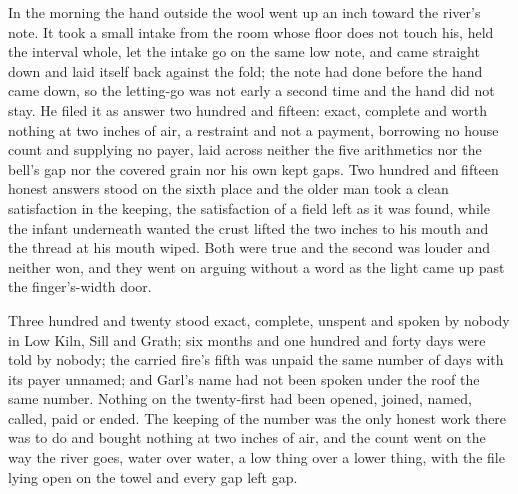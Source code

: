 In the morning the hand outside the wool went up an inch toward the river's note. It took a small intake from the room whose floor does not touch his, held the interval whole, let the intake go on the same low note, and came straight down and laid itself back against the fold; the note had done before the hand came down, so the letting-go was not early a second time and the hand did not stay. He filed it as answer two hundred and fifteen: exact, complete and worth nothing at two inches of air, a restraint and not a payment, borrowing no house count and supplying no payer, laid across neither the five arithmetics nor the bell's gap nor the covered grain nor his own kept gaps. Two hundred and fifteen honest answers stood on the sixth place and the older man took a clean satisfaction in the keeping, the satisfaction of a field left as it was found, while the infant underneath wanted the crust lifted the two inches to his mouth and the thread at his mouth wiped. Both were true and the second was louder and neither won, and they went on arguing without a word as the light came up past the finger's-width door.

Three hundred and twenty stood exact, complete, unspent and spoken by nobody in Low Kiln, Sill and Grath; six months and one hundred and forty days were told by nobody; the carried fire's fifth was unpaid the same number of days with its payer unnamed; and Garl's name had not been spoken under the roof the same number. Nothing on the twenty-first had been opened, joined, named, called, paid or ended. The keeping of the number was the only honest work there was to do and bought nothing at two inches of air, and the count went on the way the river goes, water over water, a low thing over a lower thing, with the file lying open on the towel and every gap left gap.
